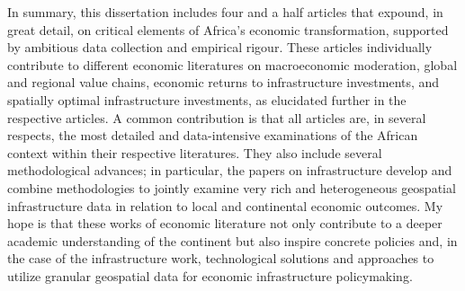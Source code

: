 \documentclass[a4paper]{article}
\begin{document}
In summary, this dissertation includes four and a half articles that expound, in great detail, on critical elements of Africa's economic transformation, supported by ambitious data collection and empirical rigour. These articles individually contribute to different economic literatures on macroeconomic moderation, global and regional value chains, economic returns to infrastructure investments, and spatially optimal infrastructure investments, as elucidated further in the respective articles. A common contribution is that all articles are, in several respects, the most detailed and data-intensive examinations of the African context within their respective literatures. They also include several methodological advances; in particular, the papers on infrastructure develop and combine methodologies to jointly examine very rich and heterogeneous geospatial infrastructure data in relation to local and continental economic outcomes. My hope is that these works of economic literature not only contribute to a deeper academic understanding of the continent but also inspire concrete policies and, in the case of the infrastructure work, technological solutions and approaches to utilize granular geospatial data for economic infrastructure policymaking. 

\newpage


\end{document}
